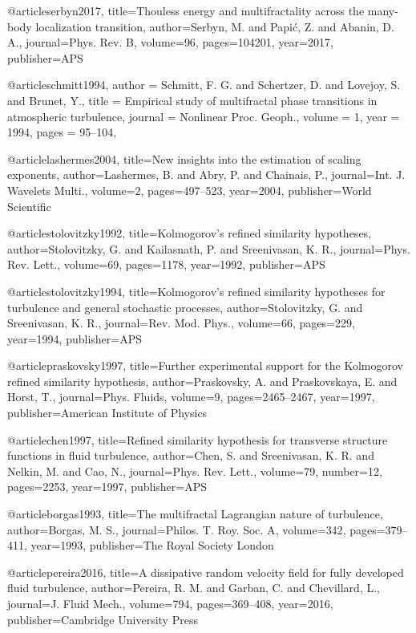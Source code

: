 @article{serbyn2017,
  title={Thouless energy and multifractality across the many-body localization transition},
  author={Serbyn, M. and Papi{\'c}, Z. and Abanin, D. A.},
  journal={Phys. Rev. B},
  volume={96},
  pages={104201},
  year={2017},
  publisher={APS}
}

@article{schmitt1994,
  author = {Schmitt, F. G. and Schertzer, D. and Lovejoy, S. and Brunet, Y.},
  title = {Empirical study of multifractal phase transitions in atmospheric turbulence},
  journal = {Nonlinear Proc. Geoph.},
  volume = {1},
  year = {1994},
  pages = {95--104},
}

@article{lashermes2004,
  title={New insights into the estimation of scaling exponents},
  author={Lashermes, B. and Abry, P. and Chainais, P.},
  journal={Int. J. Wavelets Multi.},
  volume={2},
  pages={497--523},
  year={2004},
  publisher={World Scientific}
}

@article{stolovitzky1992,
  title={Kolmogorov's refined similarity hypotheses},
  author={Stolovitzky, G. and Kailasnath, P. and Sreenivasan, K. R.},
  journal={Phys. Rev. Lett.},
  volume={69},
  pages={1178},
  year={1992},
  publisher={APS}
}


@article{stolovitzky1994,
  title={Kolmogorov's refined similarity hypotheses for turbulence and general stochastic processes},
  author={Stolovitzky, G. and Sreenivasan, K. R.},
  journal={Rev. Mod. Phys.},
  volume={66},
  pages={229},
  year={1994},
  publisher={APS}
}

@article{praskovsky1997,
  title={Further experimental support for the Kolmogorov refined similarity hypothesis},
  author={Praskovsky, A. and Praskovskaya, E. and Horst, T.},
  journal={Phys. Fluids},
  volume={9},
  pages={2465--2467},
  year={1997},
  publisher={American Institute of Physics}
}

@article{chen1997,
  title={Refined similarity hypothesis for transverse structure functions in fluid turbulence},
  author={Chen, S. and Sreenivasan, K. R. and Nelkin, M. and Cao, N.},
  journal={Phys. Rev. Lett.},
  volume={79},
  number={12},
  pages={2253},
  year={1997},
  publisher={APS}
}

@article{borgas1993,
  title={{The multifractal Lagrangian nature of turbulence}},
  author={Borgas, M. S.},
  journal={Philos. T. Roy. Soc. A},
  volume={342},
  pages={379--411},
  year={1993},
  publisher={The Royal Society London}
}

@article{pereira2016,
  title={A dissipative random velocity field for fully developed fluid turbulence},
  author={Pereira, R. M. and Garban, C. and Chevillard, L.},
  journal={J. Fluid Mech.},
  volume={794},
  pages={369--408},
  year={2016},
  publisher={Cambridge University Press}
}

